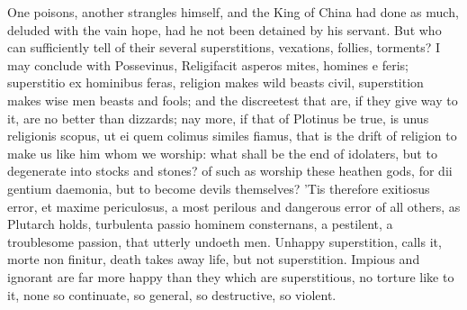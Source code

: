 {One poisons, another strangles himself, and the King of China had done
as much, deluded with the vain hope, had he not been detained by his
servant. But who can sufficiently tell of their several superstitions,
vexations, follies, torments? I may conclude with Possevinus,
Religifacit asperos mites, homines e feris; superstitio ex hominibus
feras, religion makes wild beasts civil, superstition makes wise men
beasts and fools; and the discreetest that are, if they give way to it,
are no better than dizzards; nay more, if that of Plotinus be true, is
unus religionis scopus, ut ei quem colimus similes fiamus, that is the
drift of religion to make us like him whom we worship: what shall be
the end of idolaters, but to degenerate into stocks and stones? of such
as worship these heathen gods, for dii gentium daemonia, but to
become devils themselves? 'Tis therefore exitiosus error, et maxime
periculosus, a most perilous and dangerous error of all others, as
Plutarch holds, turbulenta passio hominem consternans, a
pestilent, a troublesome passion, that utterly undoeth men. Unhappy
superstition, \Pliny{} calls it, morte non finitur, death takes away
life, but not superstition. Impious and ignorant are far more happy
than they which are superstitious, no torture like to it, none so
continuate, so general, so destructive, so violent.

}
